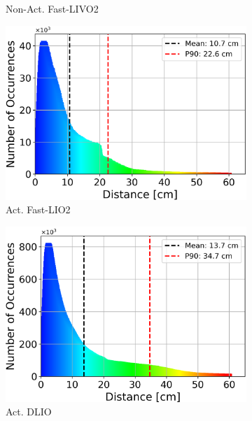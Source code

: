 \documentclass[conference]{IEEEtran}
\begin{document}
\begin{figure}
\begin{subfigure}{0.18\textwidth}
    \caption{Non-Act. Fast-LIVO2}
    \label{fig:hist_non_livo}
\end{subfigure}
\hfill
\begin{subfigure}{0.18\textwidth}
    \centering
    \includegraphics[width=\textwidth]{pics/histogram_results/histogram_cond_actuated_lio.png}
    \caption{Act. Fast-LIO2}
    \label{fig:hist_act_lio}
\end{subfigure}
\hfill
\begin{subfigure}{0.18\textwidth}
    \centering
    \includegraphics[width=\textwidth]{pics/histogram_results/histogram_cond_actuated_dlio.png}
    \caption{Act. DLIO}
    \label{fig:hist_act_dlio}
\end{subfigure}
\hfill
\begin{subfigure}{0.18\textwidth}

\end{subfigure}
\end{figure}
\end{document}
